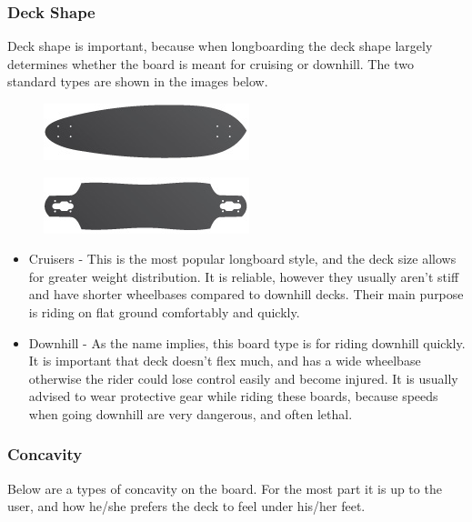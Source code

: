 \documentclass[letterpaper,12pt]{article}
\begin{document}
\subsubsection{Deck Shape}
Deck shape is important, because when longboarding the deck shape largely determines whether the board is meant for cruising or downhill. The two standard types are shown in the images below.
\begin{figure}[!htbp]\centering
\begin{minipage}{.5\textwidth}\centering
\includegraphics[width=.8\textwidth]{cruiser.jpg}
\label{cruiser}
\end{minipage}%
\begin{minipage}{.5\textwidth}\centering
\includegraphics[width=.8\textwidth]{downhill.jpg}
\label{downhill}
\end{minipage}
\end{figure}
\begin{itemize}
\item Cruisers - This is the most popular longboard style, and the deck size allows for greater weight distribution. It is reliable, however they usually aren't stiff and have shorter wheelbases compared to downhill decks. Their main purpose is riding on flat ground comfortably and quickly.

\item Downhill - As the name implies, this board type is for riding downhill quickly. It is important that deck doesn't flex much, and has a wide wheelbase otherwise the rider could lose control easily and become injured. It is usually advised to wear protective gear while riding these boards, because speeds when going downhill are very dangerous, and often lethal.

\end{itemize}

\subsubsection{Concavity}
Below are a types of concavity on the board. For the most part it is up to the user, and how he/she prefers the deck to feel under his/her feet.
\end{document}
